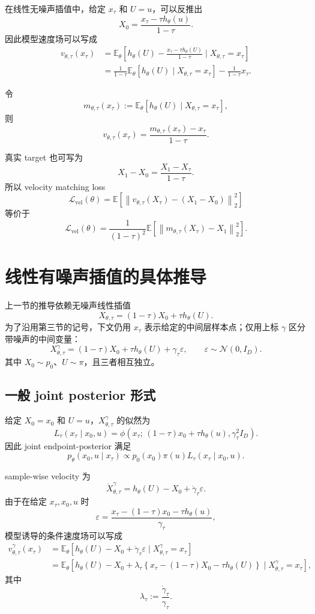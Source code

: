 \documentclass[UTF8,11pt]{ctexart}
\newcommand{\E}{\mathbb{E}}
\newcommand{\cN}{\mathcal{N}}
\newcommand{\cL}{\mathcal{L}}
\begin{document}
在线性无噪声插值中，给定 \(x_\tau\) 和 \(U=u\)，可以反推出
\[
X_0
=
\frac{x_\tau-\tau h_\theta(u)}{1-\tau}.
\]
因此模型速度场可以写成
\begin{align}
v_{\theta,\tau}(x_\tau)
&=
\E_\theta
\left[
h_\theta(U)
-
\frac{x_\tau-\tau h_\theta(U)}{1-\tau}
\mid X_{\theta,\tau}=x_\tau
\right]\nonumber\\
&=
\frac{1}{1-\tau}
\E_\theta[h_\theta(U)\mid X_{\theta,\tau}=x_\tau]
-
\frac{1}{1-\tau}x_\tau.
\end{align}

令
\[
m_{\theta,\tau}(x_\tau)
:=
\E_\theta[h_\theta(U)\mid X_{\theta,\tau}=x_\tau],
\]
则
\[
v_{\theta,\tau}(x_\tau)
=
\frac{m_{\theta,\tau}(x_\tau)-x_\tau}{1-\tau}.
\]

真实 target 也可写为
\[
X_1-X_0
=
\frac{X_1-X_\tau}{1-\tau}.
\]
所以 velocity matching loss
\[
\cL_{\mathrm{vel}}(\theta)
=
\E
\left[
\left\|
v_{\theta,\tau}(X_\tau)-(X_1-X_0)
\right\|_2^2
\right]
\]
等价于
\[
\cL_{\mathrm{vel}}(\theta)
=
\frac{1}{(1-\tau)^2}
\E
\left[
\left\|
m_{\theta,\tau}(X_\tau)-X_1
\right\|_2^2
\right].
\]

\section{线性有噪声插值的具体推导}

上一节的推导依赖无噪声线性插值
\[
X_{\theta,\tau}=(1-\tau)X_0+\tau h_\theta(U).
\]
为了沿用第三节的记号，下文仍用 \(x_\tau\) 表示给定的中间层样本点；仅用上标 \(\gamma\)
区分带噪声的中间变量：
\[
X_{\theta,\tau}^{\gamma}
=
(1-\tau)X_0+\tau h_\theta(U)+\gamma_\tau\varepsilon,
\qquad
\varepsilon\sim\cN(0,I_D).
\]
其中 \(X_0\sim p_0\)、\(U\sim\pi\)，且三者相互独立。

\subsection{一般 joint posterior 形式}

给定 \(X_0=x_0\) 和 \(U=u\)，\(X_{\theta,\tau}^{\gamma}\) 的似然为
\[
L_\tau(x_\tau\mid x_0,u)
=
\phi\!\left(
x_\tau;\,
(1-\tau)x_0+\tau h_\theta(u),
\gamma_\tau^2 I_D
\right).
\]
因此 joint endpoint-posterior 满足
\[
p_\theta(x_0,u\mid x_\tau)
\propto
p_0(x_0)\pi(u)L_\tau(x_\tau\mid x_0,u).
\]

sample-wise velocity 为
\[
\dot X_{\theta,\tau}^{\gamma}
=
h_\theta(U)-X_0+\dot\gamma_\tau\varepsilon.
\]
由于在给定 \(x_\tau,x_0,u\) 时
\[
\varepsilon
=
\frac{
x_\tau-(1-\tau)x_0-\tau h_\theta(u)
}{
\gamma_\tau
},
\]
模型诱导的条件速度场可以写成
\begin{align}
v_{\theta,\tau}^{\gamma}(x_\tau)
&=
\E_\theta
\left[
h_\theta(U)-X_0+\dot\gamma_\tau\varepsilon
\mid X_{\theta,\tau}^{\gamma}=x_\tau
\right]\nonumber\\
&=
\E_\theta
\left[
h_\theta(U)-X_0
+\lambda_\tau
\left\{
x_\tau-(1-\tau)X_0-\tau h_\theta(U)
\right\}
\mid X_{\theta,\tau}^{\gamma}=x_\tau
\right],
\end{align}
其中
\[
\lambda_\tau:=\frac{\dot\gamma_\tau}{\gamma_\tau}.
\]
\end{document}
